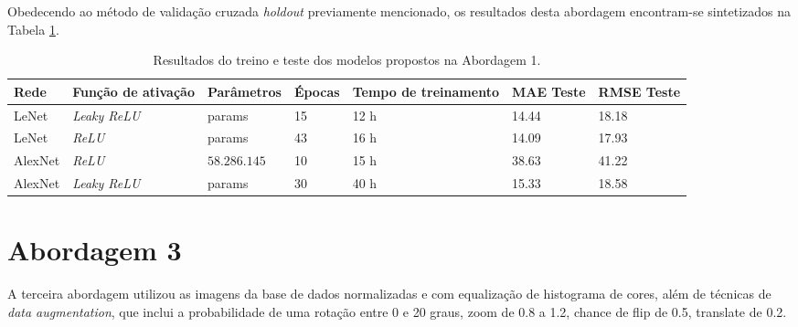 
	Obedecendo ao método de validação cruzada \emph{holdout} previamente mencionado, os resultados desta abordagem encontram-se sintetizados na Tabela \ref{tab:results-2}.

	\begin{table}[!ht]
		\caption{Resultados do treino e teste dos modelos propostos na Abordagem 1.}
		\label{tab:results-2}
		\begin{adjustbox}{width=1\textwidth}
			\begin{tabular}{l l l l l l l}
				\toprule
				Rede & Função de ativação & Parâmetros & Épocas & Tempo de treinamento & MAE Teste & RMSE Teste \\
				\midrule
				LeNet & \emph{Leaky ReLU} & params & 15 & 12 h & 14.44 & 18.18 \\
				LeNet & \emph{ReLU} & params & 43 & 16 h & 14.09 & 17.93 \\
				AlexNet & \emph{ReLU} & $58.286.145$ & 10 & 15 h & 38.63 & 41.22 \\
				AlexNet & \emph{Leaky ReLU} & params & 30 & 40 h & 15.33 & 18.58 \\
				\bottomrule
			\end{tabular}
		\end{adjustbox}
	\end{table}

\section{Abordagem 3}%
	A terceira abordagem utilizou as imagens da base de dados normalizadas e com equalização de histograma de cores, além de técnicas de \emph{data augmentation}, que inclui a probabilidade de uma rotação entre 0 e 20 graus, zoom de 0.8 a 1.2, chance de flip de 0.5, translate de 0.2.

